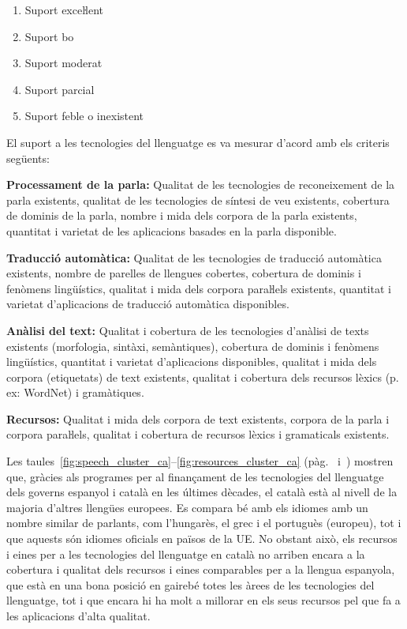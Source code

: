 \begin{multicols}{2}
\begin{enumerate}
\item Suport exceŀlent
\item Suport bo
\item Suport moderat
\item Suport parcial
\item Suport feble o inexistent
\end{enumerate}

El suport a les tecnologies del llenguatge es va mesurar d'acord amb els criteris següents:

\textbf{Processament de la parla:} Qualitat de les tecnologies de reconeixement de la parla existents, qualitat de les tecnologies de síntesi de veu  existents, cobertura de dominis de la parla, nombre i mida dels corpora de la parla existents, quantitat i varietat de les aplicacions basades en la parla disponible.
\columnbreak

\textbf{Traducció automàtica:} Qualitat de les tecnologies de traducció automàtica existents, nombre de parelles de llengues cobertes, cobertura de dominis i fenòmens lingüístics, qualitat i mida dels corpora paraŀlels existents, quantitat i varietat d'aplicacions de traducció automàtica disponibles.

\textbf{Anàlisi del text:} Qualitat i cobertura de les tecnologies d'anàlisi de texts existents (morfologia, sintàxi, semàntiques), cobertura de dominis i fenòmens lingüístics, quantitat i varietat d'aplicacions disponibles, qualitat i mida dels corpora (etiquetats) de text existents, qualitat i cobertura dels recursos lèxics (p.\,ex: WordNet) i gramàtiques.

\textbf{Recursos:} Qualitat i mida dels corpora de text existents, corpora de la parla i corpora paraŀlels, qualitat i cobertura de recursos lèxics i gramaticals existents.

Les taules~\ref{fig:speech_cluster_ca}--\ref{fig:resources_cluster_ca} (pàg.~\pageref{fig:speech_cluster_ca} i~\pageref{fig:resources_cluster_ca}) mostren que, gràcies als programes per al finançament de les tecnologies del llenguatge dels governs espanyol i català en les últimes dècades, el català està al nivell de la majoria d'altres llengües europees. Es compara bé amb els idiomes amb un nombre similar de parlants, com l'hungarès, el grec i el portuguès (europeu), tot i que aquests són idiomes oficials en països de la UE. No obstant això, els recursos i eines per a les tecnologies del llenguatge en català no arriben encara a la cobertura i qualitat dels recursos i eines comparables per a la llengua espanyola, que està en una bona posició en gairebé totes les àrees de les tecnologies del llenguatge, tot i que encara hi ha molt a millorar en els seus recursos pel que fa a les aplicacions d'alta qualitat.


\end{multicols}
